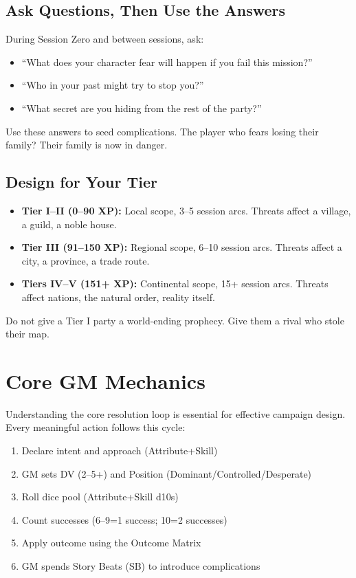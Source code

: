 \subsection{Ask Questions, Then Use the Answers}

During Session Zero and between sessions, ask:
\begin{itemize}
  \item ``What does your character fear will happen if you fail this mission?''
  \item ``Who in your past might try to stop you?''
  \item ``What secret are you hiding from the rest of the party?''
\end{itemize}
Use these answers to seed complications. The player who fears losing their family? Their family is now in danger.

\subsection{Design for Your Tier}

\begin{itemize}
  \item \textbf{Tier I--II (0--90 XP):} Local scope, 3--5 session arcs. Threats affect a village, a guild, a noble house.
  \item \textbf{Tier III (91--150 XP):} Regional scope, 6--10 session arcs. Threats affect a city, a province, a trade route.
  \item \textbf{Tiers IV--V (151+ XP):} Continental scope, 15+ session arcs. Threats affect nations, the natural order, reality itself.
\end{itemize}
Do not give a Tier I party a world-ending prophecy. Give them a rival who stole their map.

\section{Core GM Mechanics}

Understanding the core resolution loop is essential for effective campaign design. Every meaningful action follows this cycle:

\begin{enumerate}
  \item Declare intent and approach (Attribute+Skill)
  \item GM sets DV (2--5+) and Position (Dominant/Controlled/Desperate)
  \item Roll dice pool (Attribute+Skill d10s)
  \item Count successes (6--9=1 success; 10=2 successes)
  \item Apply outcome using the Outcome Matrix
  \item GM spends Story Beats (SB) to introduce complications
\end{enumerate}

